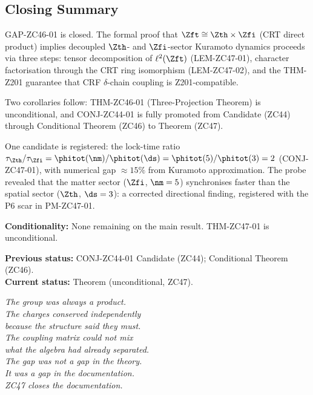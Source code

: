 \documentclass[12pt, a4paper]{article}
\begin{document}
\subsection*{Closing Summary}


\begin{keybox}
GAP-ZC46-01 is closed.
The formal proof that $\Zft \cong \Zth \times \Zfi$
(CRT direct product) implies decoupled $\Zth$- and
$\Zfi$-sector Kuramoto dynamics proceeds via three steps:
tensor decomposition of $\ell^2(\Zft)$ (LEM-ZC47-01),
character factorisation through the CRT ring isomorphism
(LEM-ZC47-02), and the THM-Z201 guarantee that CRF
$\delta$-chain coupling is Z201-compatible.

Two corollaries follow:
THM-ZC46-01 (Three-Projection Theorem) is unconditional,
and CONJ-ZC44-01 is fully promoted from Candidate (ZC44)
through Conditional Theorem (ZC46) to Theorem (ZC47).

One candidate is registered: the lock-time ratio
$\tau_{\Zth}/\tau_{\Zfi} = \phitot(\nm)/\phitot(\ds)
= \phitot(5)/\phitot(3) = 2$ (CONJ-ZC47-01), with numerical
gap $\approx 15\%$ from Kuramoto approximation.
The probe revealed that the matter sector ($\Zfi$, $\nm = 5$)
synchronises faster than the spatial sector ($\Zth$, $\ds = 3$):
a corrected directional finding, registered with the
P6 scar in PM-ZC47-01.

\medskip
\textbf{Conditionality:} None remaining on the main result.
THM-ZC47-01 is unconditional.

\textbf{Previous status:} CONJ-ZC44-01 Candidate (ZC44);
Conditional Theorem (ZC46).\\
\textbf{Current status:} Theorem (unconditional, ZC47).
\end{keybox}

\bigskip
\begin{center}
\textit{%
The group was always a product.\\[0.3em]
The charges conserved independently\\
because the structure said they must.\\[0.3em]
The coupling matrix could not mix\\
what the algebra had already separated.\\[0.3em]
The gap was not a gap in the theory.\\
It was a gap in the documentation.\\[0.3em]
ZC47 closes the documentation.}
\end{center}
\end{document}
